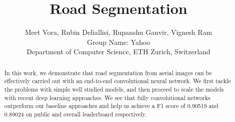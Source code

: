 \documentclass[10pt,conference,compsocconf]{IEEEtran}
\begin{document}
\title{Road Segmentation}

\author{
  Meet Vora, Rubin Deliallisi, Rupanshu Ganvir, Vignesh Ram \\
  Group Name: Yahoo \\
  Department of Computer Science, ETH Zurich, Switzerland
}

\maketitle

\begin{abstract}
In this work, we demonstrate that road segmentation from aerial images can be effectively carried out with an end-to-end convolutional neural network. We first tackle the problems with simple well studied models, and then proceed to scale the models with recent deep learning approaches. We see that fully convolutional networks outperform our baseline approaches and help us achieve a F1 score of 0.90519 and 0.89024 on public and overall leaderboard respectively. 
\end{abstract}












\end{document}
